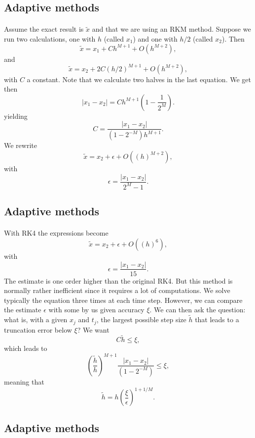 \documentclass[%
oneside,                 %
final,                   %
10pt]{article}
\begin{document}
\subsection*{Adaptive methods}

\paragraph{}
Assume the exact result is $\tilde{x}$ and that we are using an RKM method. Suppose we run two calculations, one with $h$ (called $x_1$) and one with $h/2$ (called $x_2$). Then
\[
\tilde{x}=x_1+Ch^{M+1}+O(h^{M+2}),
\] 
and
\[
\tilde{x}=x_2+2C(h/2)^{M+1}+O(h^{M+2}),
\] 
with $C$ a constant. Note that we calculate two halves in the last equation. We get then
\[
|x_1-x_2| = Ch^{M+1}(1-\frac{1}{2^M}).
\]
yielding
\[
C=\frac{|x_1-x_2|}{(1-2^{-M})h^{M+1}}.
\]
We rewrite
\[
\tilde{x}=x_2+\epsilon+O((h)^{M+2}),
\] 
with 
\[
\epsilon = \frac{|x_1-x_2|}{2^M-1}.
\]



\subsection*{Adaptive methods}

\paragraph{}
With RK4 the expressions become
\[
\tilde{x}=x_2+\epsilon+O((h)^{6}),
\] 
with
\[
\epsilon = \frac{|x_1-x_2|}{15}.
\]
The estimate is one order higher than the original RK4. But this method is normally rather inefficient since it requires a lot of computations. We solve typically the equation three times at each time step. 
However, we can compare the estimate $\epsilon$ with some by us given accuracy $\xi$. 
We can then ask the question: what is, with a given $x_j$ and $t_j$, the largest possible step size $\tilde{h}$ that leads to a truncation error below $\xi$?
We want
\[
C\tilde{h} \le \xi,
\]
which leads to 
\[
\left(\frac{\tilde{h}}{h}\right)^{M+1}\frac{|x_1-x_2|}{(1-2^{-M})}\le \xi, 
\]
meaning that
\[
\tilde{h}=h\left(\frac{\xi}{\epsilon}\right)^{1+1/M}. 
\]




\subsection*{Adaptive methods}
\end{document}
